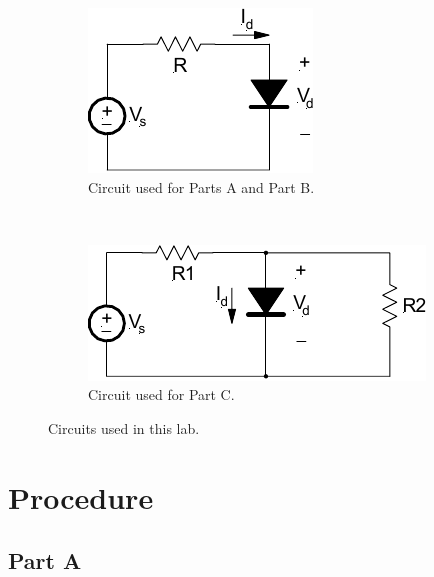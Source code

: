 \documentclass{article}
\begin{document}
\begin{figure}[hbtp]
  \centering
  \begin{subfigure}[b]{0.4\textwidth}
    \includegraphics[width=\textwidth]{circuit1}
    \caption{\label{fig:circuit1} Circuit used for Parts A and Part B.}
  \end{subfigure}%
  ~
  \begin{subfigure}[b]{0.6\textwidth}
    \includegraphics[width=\textwidth]{circuit2}
    \caption{\label{fig:circuit2} Circuit used for Part C.}
  \end{subfigure}
  \caption{\label{fig:circuits_tested} Circuits used in this lab.}
\end{figure}

\section{Procedure}
\label{sec:procedure}

\subsection{Part A}
\label{sec:proc_a}
\end{document}

